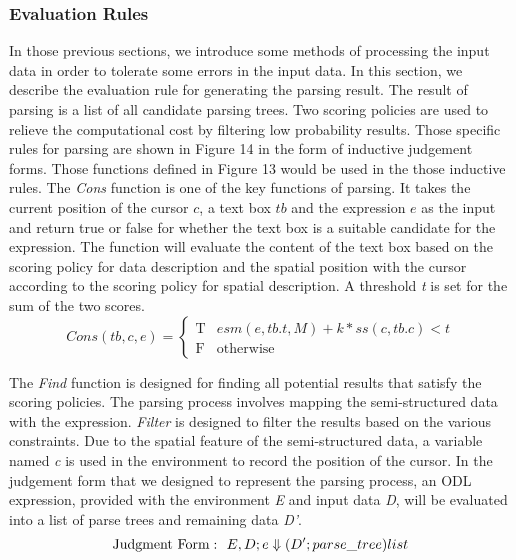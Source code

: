 \subsubsection{Evaluation Rules}

In those previous sections, we introduce some methods of processing the input data in order to tolerate some errors in the input data. In this section, we describe the evaluation rule for generating the parsing result. 
The result of parsing is a list of all candidate parsing trees. Two scoring 
policies are used to relieve the computational cost by filtering low probability results. Those specific rules for parsing are shown in Figure 14 in the form of inductive judgement forms. Those functions defined in Figure 13 would be used in the those inductive rules.
The {\em Cons} function is one of the key functions of parsing. It takes 
the current position of the cursor $c$, a text box $tb$ and the expression $e$ as the input 
and return true or false for whether the text box is a suitable candidate for the 
expression. The function will evaluate the content of the text box based on 
the scoring policy for data description and the spatial position 
with the cursor according to the scoring policy for spatial description. 
A threshold {\em t} is set for the sum of the two scores.
\begin{equation}
Cons(tb, c, e) = 
\begin{cases}
\text{T}& \text{$esm(e, tb.t, M)+k*ss(c, tb.c) < t$}\\
\text{F}& \text{otherwise}
\end{cases}
\label{equ:constraint}
\end{equation}

The {\em Find} function is 
designed for finding all potential results that satisfy the scoring policies. 
The parsing process involves mapping the semi-structured data with the expression. 
{\em Filter} is designed to filter the results based on the various constraints. 
Due to 
the spatial feature of the semi-structured data, 
a variable named {\em c} is used 
in the environment to record the position of the cursor.
In the judgement form that we designed to represent the parsing process, an ODL 
expression, provided with the environment {\em E} and input data {\em D}, will be 
evaluated into a list of parse trees and remaining data {\em D'}.
\[
  {\rm Judgment~ Form:}~~ E,D;e \Downarrow (D';parse\_tree)list
  \label{semantics:judegement} 
\]

